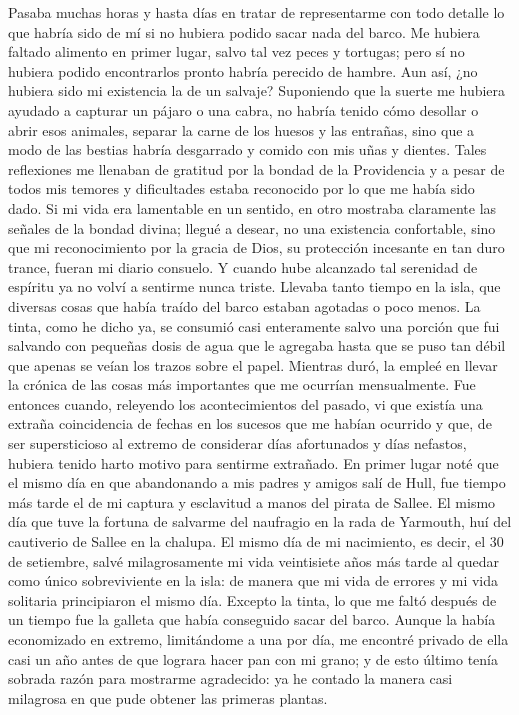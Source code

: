 \documentclass{novela}
\begin{document}
    Pasaba muchas horas y hasta días en tratar de representarme con todo detalle lo que habría sido de mí si no hubiera podido sacar nada del barco. Me hubiera faltado alimento en primer lugar, salvo tal vez peces y tortugas; pero sí no hubiera podido encontrarlos pronto habría perecido de hambre. Aun así, ¿no hubiera sido mi existencia la de un salvaje? Suponiendo que la suerte me hubiera ayudado a capturar un pájaro o una cabra, no habría tenido cómo desollar o abrir esos animales, separar la carne de los huesos y las entrañas, sino que a modo de las bestias habría desgarrado y comido con mis uñas y dientes.
    Tales reflexiones me llenaban de gratitud por la bondad de la Providencia y a pesar de todos mis temores y dificultades estaba reconocido por lo que me había sido dado. Si mi vida era lamentable en un sentido, en otro mostraba claramente las señales de la bondad divina; llegué a desear, no una existencia confortable, sino que mi reconocimiento por la gracia de Dios, su protección incesante en tan duro trance, fueran mi diario consuelo. Y cuando hube alcanzado tal serenidad de espíritu ya no volví a sentirme nunca triste.
    Llevaba tanto tiempo en la isla, que diversas cosas que había traído del barco estaban agotadas o poco menos. La tinta, como he dicho ya, se consumió casi enteramente salvo una porción que fui salvando con pequeñas dosis de agua que le agregaba hasta que se puso tan débil que apenas se veían los trazos sobre el papel. Mientras duró, la empleé en llevar la crónica de las cosas más importantes que me ocurrían mensualmente. Fue entonces cuando, releyendo los acontecimientos del pasado, vi que existía una extraña coincidencia de fechas en los sucesos que me habían ocurrido y que, de ser supersticioso al extremo de considerar días afortunados y días nefastos, hubiera tenido harto motivo para sentirme extrañado.
    En primer lugar noté que el mismo día en que abandonando a mis padres y amigos salí de Hull, fue tiempo más tarde el de mi captura y esclavitud a manos del pirata de Sallee.
    El mismo día que tuve la fortuna de salvarme del naufragio en la rada de Yarmouth, huí del cautiverio de Sallee en la chalupa.
    El mismo día de mi nacimiento, es decir, el 30 de setiembre, salvé milagrosamente mi vida veintisiete años más tarde al quedar como único sobreviviente en la isla: de manera que mi vida de errores y mi vida solitaria principiaron el mismo día.
    Excepto la tinta, lo que me faltó después de un tiempo fue la galleta que había conseguido sacar del barco. Aunque la había economizado en extremo, limitándome a una por día, me encontré privado de ella casi un año antes de que lograra hacer pan con mi grano; y de esto último tenía sobrada razón para mostrarme agradecido: ya he contado la manera casi milagrosa en que pude obtener las primeras plantas.
\end{document}
